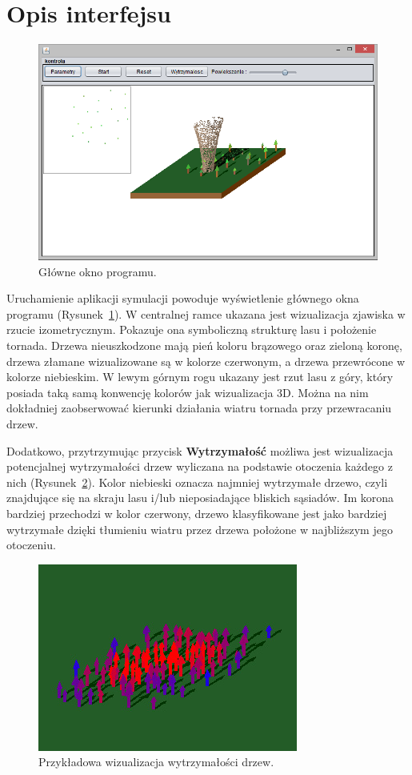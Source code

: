 \section{Opis interfejsu}

\begin{figure}[!h]
	\center
	\includegraphics[scale=0.75]{gui_main}
	\caption{Główne okno programu.}
	\label{fig:gui_main}
\end{figure} 

Uruchamienie aplikacji symulacji powoduje wyświetlenie głównego okna programu (Rysunek~\ref{fig:gui_main}). W centralnej ramce ukazana jest wizualizacja zjawiska w rzucie izometrycznym. Pokazuje ona symboliczną strukturę lasu i położenie tornada. Drzewa nieuszkodzone mają pień koloru brązowego oraz zieloną koronę, drzewa złamane wizualizowane są w kolorze czerwonym, a drzewa przewrócone w kolorze niebieskim. W lewym górnym rogu ukazany jest rzut lasu z góry, który posiada taką samą konwencję kolorów jak wizualizacja 3D. Można na nim dokładniej zaobserwować kierunki działania wiatru tornada przy przewracaniu drzew.

Dodatkowo, przytrzymując przycisk \textbf{Wytrzymałość} możliwa jest wizualizacja potencjalnej wytrzymałości drzew wyliczana na podstawie otoczenia każdego z nich (Rysunek~\ref{fig:gui_wytrz}). Kolor niebieski oznacza najmniej wytrzymałe drzewo, czyli znajdujące się na skraju lasu i/lub nieposiadające bliskich sąsiadów. Im korona bardziej przechodzi w kolor czerwony, drzewo klasyfikowane jest jako bardziej wytrzymałe dzięki tłumieniu wiatru przez drzewa położone w najbliższym jego otoczeniu.

\begin{figure}[!h]
	\center
	\includegraphics[scale=1]{gui_wytrz}
	\caption{Przykładowa wizualizacja wytrzymałości drzew.}
	\label{fig:gui_wytrz}
\end{figure} 

